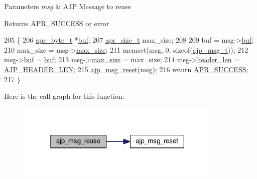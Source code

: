 \begin{DoxyParams}{Parameters}
{\em msg} & A\+JP Message to reuse \\
\hline
\end{DoxyParams}
\begin{DoxyReturn}{Returns}
A\+P\+R\+\_\+\+S\+U\+C\+C\+E\+SS or error 
\end{DoxyReturn}

\begin{DoxyCode}
205 \{
206     \hyperlink{group__apr__platform_gadcfa334915b4605a0052cb4ca542eb3a}{apr\_byte\_t} *\hyperlink{group__APACHE__CORE__PROTO_ga17bc47ccf1b618ed082a4ff4f2cc7f7e}{buf};
207     \hyperlink{group__apr__platform_gaaa72b2253f6f3032cefea5712a27540e}{apr\_size\_t} max\_size;
208 
209     buf = msg->\hyperlink{structajp__msg_a7343b1803e9177dccb3c4716a5e12c3a}{buf};
210     max\_size = msg->\hyperlink{structajp__msg_a70f7c841e5b344fc94175a0ebcd7f062}{max\_size};
211     memset(msg, 0, \textcolor{keyword}{sizeof}(\hyperlink{structajp__msg}{ajp\_msg\_t}));
212     msg->\hyperlink{structajp__msg_a7343b1803e9177dccb3c4716a5e12c3a}{buf} = \hyperlink{group__APACHE__CORE__PROTO_ga17bc47ccf1b618ed082a4ff4f2cc7f7e}{buf};
213     msg->\hyperlink{structajp__msg_a70f7c841e5b344fc94175a0ebcd7f062}{max\_size} = max\_size;
214     msg->\hyperlink{structajp__msg_a602e2c87aa4d6c3cff86c447d5e320a4}{header\_len} = \hyperlink{group__AJP__defines_ga46f6439c978873cb76944ae66a5c2e4d}{AJP\_HEADER\_LEN};
215     \hyperlink{group__AJP__api_gac85c7fdc0995b29207d13c7ea35b3f1e}{ajp\_msg\_reset}(msg);
216     \textcolor{keywordflow}{return} \hyperlink{group__apr__errno_ga9ee311b7bf1c691dc521d721339ee2a6}{APR\_SUCCESS};
217 \}
\end{DoxyCode}


Here is the call graph for this function\+:
\nopagebreak
\begin{figure}[H]
\begin{center}
\leavevmode
\includegraphics[width=279pt]{group__AJP__api_ga4fd149b37d846c30cadfc593b31e272e_cgraph}
\end{center}
\end{figure}




